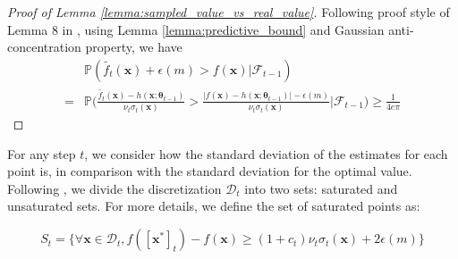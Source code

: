 \begin{proof}[Proof of Lemma \ref{lemma:sampled_value_vs_real_value}]
    Following proof style of Lemma 8 in \citet{zhou2020neural}, using Lemma \ref{lemma:predictive_bound} and Gaussian anti-concentration property, we have 
\begin{equation*}
    \begin{split}
        & \mathbb{P}(\widetilde{f_t}(\mathbf{x}) + \epsilon(m) > f(\mathbf{x}) \lvert \mathcal{F}_{t-1}) \\
        = & \mathbb{P} \Bigg(\frac{\widetilde{f_t}(\mathbf{x}) - h(\mathbf{x}; \boldsymbol{\theta}_{t-1}) }{\nu_t \sigma_t(\mathbf{x})} >   \frac{ \lvert f(\mathbf{x}) - h(\mathbf{x}; \boldsymbol{\theta}_{t-1}) \rvert - \epsilon(m) }{\nu_t \sigma_t(\mathbf{x})}  \Bigg \lvert \mathcal{F}_{t-1} \Bigg) \geq \frac{1}{4e\pi}
    \end{split}
\end{equation*}
\end{proof}




For any step $t$, we consider how the standard deviation of the estimates for each point is, in comparison with the standard deviation for the optimal value.
Following \citet{zhang2021neural}, we divide the discretization $\mathcal D_t$ into two sets: saturated and unsaturated sets. For more details, we define the set of saturated points as:

\begin{equation}
\label{def:saturated_set}
S_t = \{\forall \mathbf{x} \in \mathcal{D}_t, f([\mathbf{x}^*]_t) - f(\mathbf{x}) \geq (1+c_t)\nu_t \sigma_t(\mathbf{x})+ 2\epsilon(m)\}
\end{equation}




